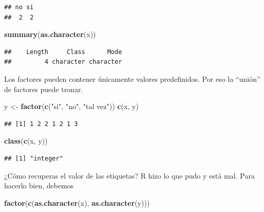 \documentclass[]{article}
\newenvironment{Shaded}{\begin{snugshade}}{\end{snugshade}}
\newcommand{\KeywordTok}[1]{\textcolor[rgb]{0.13,0.29,0.53}{\textbf{{#1}}}}
\newcommand{\StringTok}[1]{\textcolor[rgb]{0.31,0.60,0.02}{{#1}}}
\newcommand{\NormalTok}[1]{{#1}}
\begin{document}
\begin{verbatim}
## no si 
##  2  2
\end{verbatim}

\begin{Shaded}
\begin{Highlighting}[]
\KeywordTok{summary}\NormalTok{(}\KeywordTok{as.character}\NormalTok{(x))}
\end{Highlighting}
\end{Shaded}

\begin{verbatim}
##    Length     Class      Mode 
##         4 character character
\end{verbatim}

Los factores pueden contener únicamente valores predefinidos. Por eso la
``unión'' de factores puede tronar.

\begin{Shaded}
\begin{Highlighting}[]
\NormalTok{y <-}\StringTok{ }\KeywordTok{factor}\NormalTok{(}\KeywordTok{c}\NormalTok{(}\StringTok{"si"}\NormalTok{, }\StringTok{"no"}\NormalTok{, }\StringTok{"tal vez"}\NormalTok{))}
\KeywordTok{c}\NormalTok{(x, y)}
\end{Highlighting}
\end{Shaded}

\begin{verbatim}
## [1] 1 2 2 1 2 1 3
\end{verbatim}

\begin{Shaded}
\begin{Highlighting}[]
\KeywordTok{class}\NormalTok{(}\KeywordTok{c}\NormalTok{(x, y))}
\end{Highlighting}
\end{Shaded}

\begin{verbatim}
## [1] "integer"
\end{verbatim}

¿Cómo recuperas el valor de las etiquetas? R hizo lo que pudo y está
mal. Para hacerlo bien, debemos

\begin{Shaded}
\begin{Highlighting}[]
\KeywordTok{factor}\NormalTok{(}\KeywordTok{c}\NormalTok{(}\KeywordTok{as.character}\NormalTok{(x), }\KeywordTok{as.character}\NormalTok{(y)))}
\end{Highlighting}
\end{Shaded}
\end{document}
